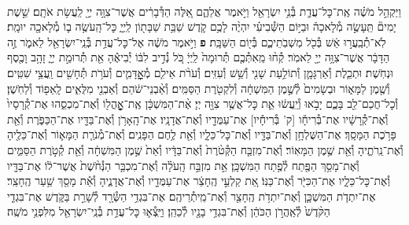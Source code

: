 \documentclass[twoside, openany, parskip=half, 11pt]{book}
\begin{document}
\begin{footnotesize}
\begin{multicols}{2}
\\
וַיַּקְהֵ֣ל מֹשֶׁ֗ה אֶֽת־כׇּל־עֲדַ֛ת בְּ֯נֵ֥י יִשְׂרָאֵ֖ל וַיֹּ֣אמֶר אֲלֵהֶ֑ם אֵ֚לֶּה הַדְּ֯בָרִ֔ים אֲשֶׁר־צִוָּ֥ה יְיָ֖ לַֽעֲשׂ֥ת אֹתָֽם׃ שֵׁ֣שֶׁת יָמִים֘ תֵּֽעָשֶׂ֣ה מְ֯לָאכָה֒ וּבַיּ֣וֹם הַשְּׁ֯בִיעִ֗י יִהְיֶ֨ה לָכֶ֥ם קֹ֛דֶשׁ שַׁבַּ֥ת שַׁבָּת֖וֹן לַֽיְיָ֑ כׇּל־הָֽעֹשֶׂ֥ה ב֛וֹ מְ֯לָאכָ֖ה יוּמָֽת׃ לֹֽא־תְ֯בַֽעֲר֣וּ אֵ֔שׁ בְּ֯כֹ֖ל מֽשְׁבֹֽתֵיכֶ֑ם בְּ֯י֖וֹם הַשַּׁבָּֽת׃ \textbf{פ}
וַיֹּ֣אמֶר מֹשֶׁ֔ה אֶל־כׇּל־עֲדַ֥ת בְּ֯נֵֽי־יִשְׂרָאֵ֖ל לֵאמֹ֑ר זֶ֣ה הַדָּבָ֔ר אֲשֶׁר־צִוָּ֥ה יְיָ֖ לֵאמֹֽר׃ קְ֯ח֨וּ מֵֽאִתְּ֯כֶ֤ם תְּ֯רוּמָה֙ לַֽיְיָ֔ כֹּ֚ל נְ֯דִ֣יב לִבּ֔וֹ יְ֯בִיאֶ֕הָ אֵ֖ת תְּ֯רוּמַ֣ת יְיָ֑ זָהָ֥ב וָכֶ֖סֶף וּנְחֹֽשֶׁת׃ וּתְכֵ֧לֶת וְ֯אַרְגָּמָ֛ן וְ֯תוֹלַ֥עַת שָׁנִ֖י וְ֯שֵׁ֥שׁ וְ֯עִזִּֽים׃ וְ֯עֹרֹ֨ת אֵילִ֧ם מְ֯אׇׇׇׇׇׇׇׇׇׇׇׇדָּמִ֛ים וְ֯עֹרֹ֥ת תְּ֯חָשִׁ֖ים וַֽעֲצֵ֥י שִׁטִּֽים׃ וְ֯שֶׁ֖מֶן לַמָּא֑וֹר וּבְשָׂמִים֙ לְ֯שֶׁ֣מֶן הַמִּשְׁחָ֔ה וְ֯לִקְטֹ֖רֶת הַסַּמִּֽים׃ וְ֯אַ֨בְנֵי־שֹׁ֔הַם וְ֯אַבְנֵ֖י מִלֻּאִ֑ים לָֽאֵפ֖וֹד וְ֯לַחֹֽשֶׁן׃ וְ֯כׇל־חֲכַם־לֵ֖ב בָּכֶ֑ם יָבֹ֣אוּ וְ֯יַֽעֲשׂ֔וּ אֵ֛ת כׇּל־אֲשֶׁ֥ר צִוָּ֖ה יְיָ׃
אֶ֨ת־הַמִּשְׁכָּ֔ן אֶֽת־אׇׇׇׇׇׇׇׇׇׇֽהֳל֖וֹ וְ֯אֶת־מִכְסֵ֑הוּ אֶת־קְ֯רָסָיו֙ וְ֯אֶת־קְ֯רָשָׁ֔יו אֶת־בְּ֯רִיחָ֕ו [ק' בְּ֯רִיחָ֕יו] אֶת־עַמֻּדָ֖יו וְ֯אֶת־אֲדָנָֽיו׃ אֶת־הָֽאָרֹ֥ן וְ֯אֶת־בַּדָּ֖יו אֶת־הַכַּפֹּ֑רֶת וְ֯אֵ֖ת פָּרֹ֥כֶת הַמָּסָֽךְ׃ אֶת־הַשֻּׁלְחָ֥ן וְ֯אֶת־בַּדָּ֖יו וְ֯אֶת־כׇּל־כֵּלָ֑יו וְ֯אֵ֖ת לֶ֥חֶם הַפָּנִֽים׃ וְ֯אֶת־מְ֯נֹרַ֧ת הַמָּא֛וֹר וְ֯אֶת־כֵּלֶ֖יהָ וְ֯אֶת־נֵֽרֹתֶ֑יהָ וְ֯אֵ֖ת שֶׁ֥מֶן הַמָּאֽוֹר׃ וְ֯אֶת־מִזְבַּ֤ח הַקְּ֯טֹ֨רֶת֙ וְ֯אֶת־בַּדָּ֔יו וְ֯אֵת֙ שֶׁ֣מֶן הַמִּשְׁחָ֔ה וְ֯אֵ֖ת קְ֯טֹ֣רֶת הַסַּמִּ֑ים וְ֯אֶת־מָסַ֥ךְ הַפֶּ֖תַח לְ֯פֶ֥תַח הַמִּשְׁכָּֽן׃ אֵ֣ת מִזְבַּ֣ח הָֽעֹלָ֗ה וְ֯אֶת־מִכְבַּ֤ר הַנְּ֯חֹ֨שֶׁת֙ אֲשֶׁר־ל֔וֹ אֶת־בַּדָּ֖יו וְ֯אֶת־כׇּל־כֵּלָ֑יו אֶת־הַכִּיֹּ֖ר וְ֯אֶת־כַּנּֽוֹ׃ אֵ֚ת קַלְעֵ֣י הֶֽחָצֵ֔ר אֶת־עַמֻּדָ֖יו וְ֯אֶת־אֲדָנֶ֑יהָ וְ֯אֵ֕ת מָסַ֖ךְ שַׁ֥עַר הֶֽחָצֵֽר׃ אֶת־יִתְדֹ֧ת הַמִּשְׁכָּ֛ן וְ֯אֶת־יִתְדֹ֥ת הֶֽחָצֵ֖ר וְ֯אֶת־מֵֽיתְ֯רֵיהֶֽם׃ אֶת־בִּגְדֵ֥י הַשְּׂ֯רָ֖ד לְ֯שָׁרֵ֣ת בַּקֹּ֑דֶשׁ אֶת־בִּגְדֵ֤י הַקֹּ֨דֶשׁ֙ לְ֯אַֽהֲרֹ֣ן הַכֹּהֵ֔ן וְ֯אֶת־בִּגְדֵ֥י בָנָ֖יו לְ֯כַהֵֽן׃ וַיֵּֽצְ֯א֛וּ כׇּל־עֲדַ֥ת בְּ֯נֵֽי־יִשְׂרָאֵ֖ל מִלִּפְנֵ֥י מֹשֶֽׁה׃


\end{multicols}
\end{footnotesize}
\end{document}
